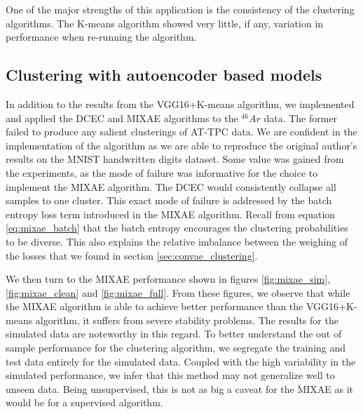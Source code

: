 One of the major strengths of this application is the consistency of the clustering algorithms. The K-means algorithm showed very little, if any, variation in performance when re-running the algorithm. 

\subsection{Clustering with autoencoder based models}

In addition to the results from the VGG16+K-means algorithm, we implemented and applied the DCEC and MIXAE algorithms to the ${}^{46}Ar$ data. The former failed to produce any salient clusterings of AT-TPC data. We are confident in the implementation of the algorithm as we are able to reproduce the original author's results on the MNIST handwritten digits dataset. Some value was gained from the experiments, as the mode of failure was informative for the choice to implement the MIXAE algorithm. The DCEC would consistently collapse all samples to one cluster. This exact mode of failure is addressed by the batch entropy loss term introduced in the MIXAE algorithm. Recall from equation \ref{eq:mixae_batch} that the batch entropy encourages the clustering probabilities to be diverse. This also explains the relative imbalance between the weighing of the losses that we found in section \ref{sec:convae_clustering}.

We then turn to the MIXAE performance shown in figures \ref{fig:mixae_sim}, \ref{fig:mixae_clean} and \ref{fig:mixae_full}. From these figures, we observe that while the MIXAE algorithm is able to achieve better performance than the VGG16+K-means algorithm, it suffers from severe stability problems. The results for the simulated data are noteworthy in this regard. To better understand the out of sample performance for the clustering algorithm, we segregate the training and test data entirely for the simulated data. Coupled with the high variability in the simulated performance, we infer that this method may not generalize well to unseen data. Being unsupervised, this is not as big a caveat for the MIXAE as it would be for a supervised algorithm.

